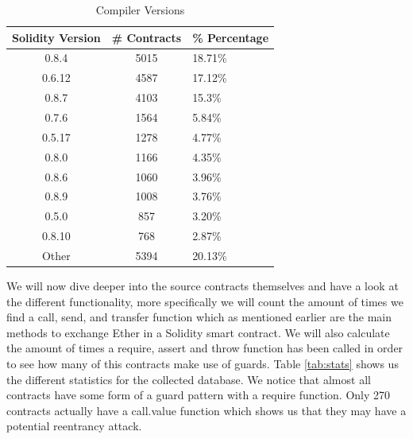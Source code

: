 \documentclass[sigconf]{acmart}
\begin{document}
\begin{table}
  \caption{Compiler Versions}
  \label{tab:versions}
  \begin{tabular}{ccl}
    \toprule
    Solidity Version & \# Contracts & \% Percentage\\
    \midrule
    0.8.4&5015&18.71\%\\
    0.6.12&4587&17.12\%\\
    0.8.7&4103&15.3\%\\
    0.7.6&1564&5.84\%\\
    0.5.17&1278&4.77\%\\
    0.8.0&1166&4.35\%\\
    0.8.6&1060&3.96\%\\
    0.8.9&1008&3.76\%\\
    0.5.0&857&3.20\%\\
    0.8.10&768&2.87\%\\
    Other&5394&20.13\%\\
  \bottomrule
\end{tabular}
\end{table}
We will now dive deeper into the source contracts themselves and have a look at the different functionality, more specifically we will count the amount of times we find a call, send, and transfer function which as mentioned earlier are the main methods to exchange Ether in a Solidity smart contract. We will also calculate the amount of times a require, assert and throw function has been called in order to see how many of this contracts make use of guards. Table \ref{tab:stats} shows us the different statistics for the collected database. We notice that almost all contracts have some form of a guard pattern with a require function. Only 270 contracts actually have a call.value function which shows us that they may have a potential reentrancy attack. 
\end{document}
